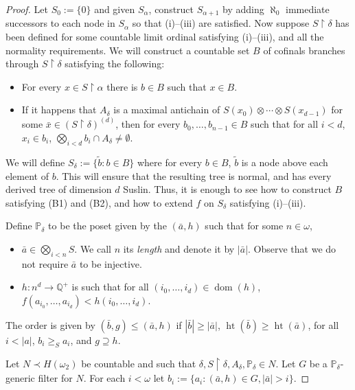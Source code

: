 \documentclass{amsart}
\theoremstyle{definition}
\renewcommand{\P}{\mathbb{P}}
\newcommand{\Q}{\mathbb{Q}}
\newcommand{\es}{\emptyset}
\newcommand{\res}{\restriction}
\DeclareMathOperator{\dom}{dom}
\DeclareMathOperator{\hht}{ht}
\begin{document}
\begin{proof}
  Let $S_{0} := \{0\}$ and given
  $S_{\alpha}$, construct $S_{\alpha+1}$ by adding $\aleph_{0}$
  immediate successors to each node in $S_{\alpha}$ so that
  (i)--(iii) are satisfied. Now
  suppose $S \res \delta$
  has been defined for some countable limit ordinal satisfying (i)--(iii),
  and all the normality requirements. We will construct
  a countable set $B$ of cofinals branches through $S \res \delta$
  satisfying the following:
  \begin{itemize}
    \item[(B1)] For every $x \in S \res \alpha$ there is $b \in B$ such
    that $x \in B$.
    \item[(B2)] If it happens that $A_{\delta}$ is a maximal
    antichain of $S(x_{0}) \otimes \cdots \otimes S(x_{d-1})$ for
    some $\bar{x} \in (S\res \delta)^{(d)}$, then for every
    $b_{0},\dots,b_{n-1} \in B$ such that for all $i < d$,
    $x_{i} \in b_{i}$, $\bigotimes_{i < d}b_{i} \cap A_{\delta} \neq \es$.
  \end{itemize}
  We will define $S_{\delta}:= \{\tilde{b} : b \in B\}$ where for every
  $b \in B$, $\tilde{b}$ is a node above each element of $b$.
  This will ensure that the resulting tree is normal,
  and has every derived tree of dimension $d$ Suslin. Thus,
  it is enough to see how to construct $B$ satisfying (B1) and (B2),
  and how to extend $f$ on $S_{\delta}$ satisfying (i)--(iii).

  Define $\P_{\delta}$ to be the poset given by the
  $(\bar{a},h)$ such that for some $n \in \omega$,
  \begin{itemize}
    \item $\bar{a} \in \bigotimes_{i < n}S$. We call $n$ its \emph{length}
    and denote it by $|\bar{a}|$.
    Observe that we do not require $\bar{a}$ to be injective.
    \item $h : n^{d} \to \Q^{+}$ is such that for all
    $(i_{0},\dots,i_{d}) \in \dom(h)$,
    $f(a_{i_{0}},\dots,a_{i_{d}}) < h(i_{0},\dots,i_{d})$.
  \end{itemize}
  The order is given by $(\bar{b},g) \le (\bar{a},h)$ if
  $|\bar{b}| \ge |\bar{a}|$, $\hht(\bar{b}) \ge \hht(\bar{a})$,
  for all $i < |a|$, $b_{i} \ge_{S} a_{i}$, and
  $g \supseteq h$.

  Let $N \prec H(\omega_{2})$ be countable and such that
  $\delta,S\res\delta,A_{\delta},\P_{\delta} \in N$. Let
  $G$ be a $\P_{\delta}$-generic filter for $N$. For each
  $i < \omega$ let $b_{i} := \{a_{i} : (\bar{a},h) \in G, |\bar{a}| > i\}$.


\end{proof}
\end{document}
